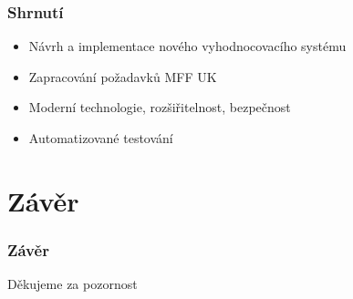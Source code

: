 \documentclass{beamer}
\begin{document}
\begin{frame}
	\frametitle{Shrnutí}
	\begin{itemize}
		\item Návrh a implementace nového vyhodnocovacího systému
		\item Zapracování požadavků MFF UK
		\item Moderní technologie, rozšiřitelnost, bezpečnost
		\item Automatizované testování
	\end{itemize}
\end{frame}

\section{Závěr}
\begin{frame}
	\frametitle{Závěr}
	\centering
	\LARGE{Děkujeme za pozornost}
\end{frame}
\end{document}
